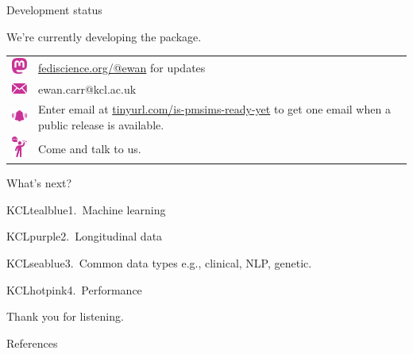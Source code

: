 \documentclass[11pt]{beamer}
\newcommand{\sgap}{\vspace{0.5em}}
\begin{document}
\begin{frame}[t]{Development status}

	\sgap
	We're currently developing the package.%
	\vspace{1em}


	\begin{tabular}{cp{}}
		\includegraphics[width=2em,valign=c]{figures/mastodon.pdf} &
		\href{https://fediscience.org/@ewan}{\textcolor{KCLhotpink}{fediscience.org/@ewan}}
		for updates                                                  \\[1.7em]
		\includegraphics[width=2em,valign=c]{figures/email.pdf} & \textcolor{KCLhotpink}{ewan.carr@kcl.ac.uk}\\[1.7em]
		\includegraphics[width=2em,valign=c]{figures/bell.pdf}    &
		Enter email at
		\href{https://tinyurl.com/is-pmsims-ready-yet}{\textcolor{KCLhotpink}{tinyurl.com/is-pmsims-ready-yet}}
		to get one email when a public release is available.         \\[1.7em]
		\includegraphics[width=2em,valign=c]{figures/hi.pdf}       &
		Come and talk to us.
	\end{tabular}


\end{frame}

\begin{frame}[t]{What's next?}

\begin{cbox}{KCLtealblue}{1.\ Machine learning}{}

\end{cbox}

\begin{cbox}{KCLpurple}{2.\ Longitudinal data}{}

\end{cbox}

\begin{cbox}{KCLseablue}{3.\ Common data types}{}
e.g., clinical, NLP, genetic.

\end{cbox}

\begin{cbox}{KCLhotpink}{4.\ Performance}{}

\end{cbox}

\end{frame}


\begin{frame}[c]
    \centering
	Thank you for listening.
\end{frame}

\appendix

\begin{frame}[allowframebreaks]{References}
    \renewcommand*{\bibfont}{\scriptsize}
	\printbibliography
\end{frame}
\end{document}
